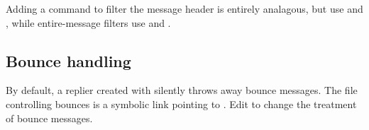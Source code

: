\documentclass{book}
\begin{document}
Adding a command to filter the message header is entirely analagous,
but use  and
, while entire-message filters use
 and .


\subsection{Bounce handling}
By default, a replier created with  silently
throws away bounce messages.  The  file controlling
bounces is a symbolic link pointing to .  Edit
 to change the treatment of bounce messages.
\end{document}
